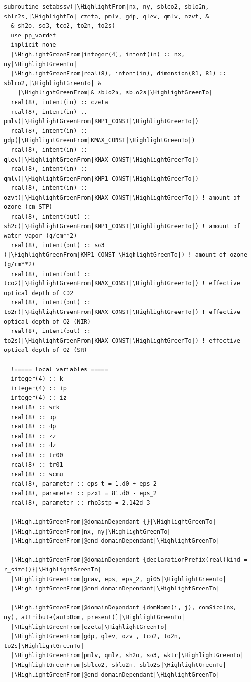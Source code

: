 \begin{lstlisting}[firstnumber=1, name=absswHybrid, label=listing:absswHybrid, caption={Example ASUCA kernel subroutine in Hybrid Fortran}, escapechar=|]
subroutine setabssw(|\HighlightFrom|nx, ny, sblco2, sblo2n, sblo2s,|\HighlightTo| czeta, pmlv, gdp, qlev, qmlv, ozvt, &
  & sh2o, so3, tco2, to2n, to2s)
  use pp_vardef
  implicit none
  |\HighlightGreenFrom|integer(4), intent(in) :: nx, ny|\HighlightGreenTo|
  |\HighlightGreenFrom|real(8), intent(in), dimension(81, 81) :: sblco2,|\HighlightGreenTo| &
    |\HighlightGreenFrom|& sblo2n, sblo2s|\HighlightGreenTo|
  real(8), intent(in) :: czeta
  real(8), intent(in) :: pmlv(|\HighlightGreenFrom|KMP1_CONST|\HighlightGreenTo|)
  real(8), intent(in) :: gdp(|\HighlightGreenFrom|KMAX_CONST|\HighlightGreenTo|)
  real(8), intent(in) :: qlev(|\HighlightGreenFrom|KMAX_CONST|\HighlightGreenTo|)
  real(8), intent(in) :: qmlv(|\HighlightGreenFrom|KMP1_CONST|\HighlightGreenTo|)
  real(8), intent(in) :: ozvt(|\HighlightGreenFrom|KMAX_CONST|\HighlightGreenTo|) ! amount of ozone (cm-STP)
  real(8), intent(out) :: sh2o(|\HighlightGreenFrom|KMP1_CONST|\HighlightGreenTo|) ! amount of water vapor (g/cm**2)
  real(8), intent(out) :: so3 (|\HighlightGreenFrom|KMP1_CONST|\HighlightGreenTo|) ! amount of ozone (g/cm**2)
  real(8), intent(out) :: tco2(|\HighlightGreenFrom|KMAX_CONST|\HighlightGreenTo|) ! effective optical depth of CO2
  real(8), intent(out) :: to2n(|\HighlightGreenFrom|KMAX_CONST|\HighlightGreenTo|) ! effective optical depth of O2 (NIR)
  real(8), intent(out) :: to2s(|\HighlightGreenFrom|KMAX_CONST|\HighlightGreenTo|) ! effective optical depth of O2 (SR)

  !===== local variables =====
  integer(4) :: k
  integer(4) :: ip
  integer(4) :: iz
  real(8) :: wrk
  real(8) :: pp
  real(8) :: dp
  real(8) :: zz
  real(8) :: dz
  real(8) :: tr00
  real(8) :: tr01
  real(8) :: wcmu
  real(8), parameter :: eps_t = 1.d0 + eps_2
  real(8), parameter :: pzx1 = 81.d0 - eps_2
  real(8), parameter :: rho3stp = 2.142d-3

  |\HighlightGreenFrom|@domainDependant {}|\HighlightGreenTo|
  |\HighlightGreenFrom|nx, ny|\HighlightGreenTo|
  |\HighlightGreenFrom|@end domainDependant|\HighlightGreenTo|

  |\HighlightGreenFrom|@domainDependant {declarationPrefix(real(kind = r_size))}|\HighlightGreenTo|
  |\HighlightGreenFrom|grav, eps, eps_2, gi05|\HighlightGreenTo|
  |\HighlightGreenFrom|@end domainDependant|\HighlightGreenTo|

  |\HighlightGreenFrom|@domainDependant {domName(i, j), domSize(nx, ny), attribute(autoDom, present)}|\HighlightGreenTo|
  |\HighlightGreenFrom|czeta|\HighlightGreenTo|
  |\HighlightGreenFrom|gdp, qlev, ozvt, tco2, to2n, to2s|\HighlightGreenTo|
  |\HighlightGreenFrom|pmlv, qmlv, sh2o, so3, wktr|\HighlightGreenTo|
  |\HighlightGreenFrom|sblco2, sblo2n, sblo2s|\HighlightGreenTo|
  |\HighlightGreenFrom|@end domainDependant|\HighlightGreenTo|


\end{lstlisting}

